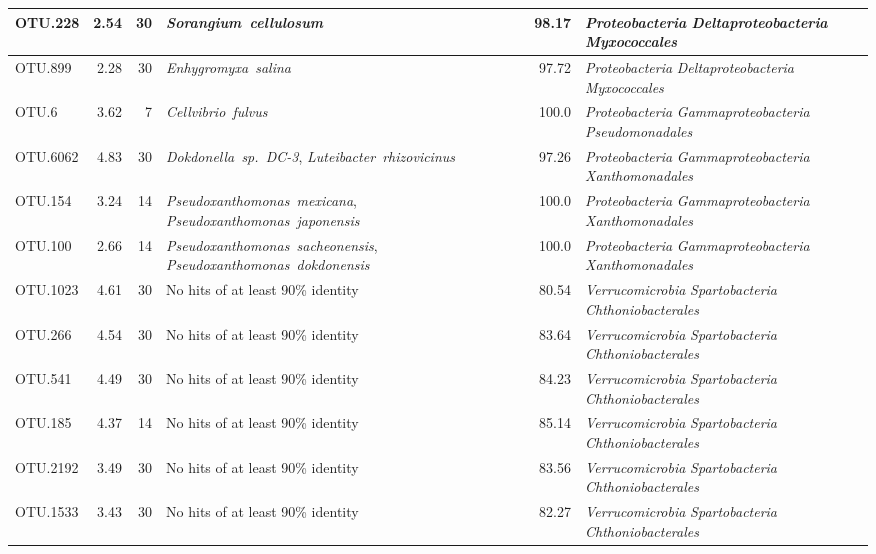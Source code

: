 \begin{ThreePartTable}
\begin{longtable}{lrrP{5cm}rP{5cm}}
OTU.228 & 2.54 & 30 & \mbox{\textit{Sorangium cellulosum}} & 98.17 & \mbox{\textit{Proteobacteria}} \mbox{\textit{Deltaproteobacteria}} \mbox{\textit{Myxococcales}} \\ \midrule
OTU.899 & 2.28 & 30 & \mbox{\textit{Enhygromyxa salina}} & 97.72 & \mbox{\textit{Proteobacteria}} \mbox{\textit{Deltaproteobacteria}} \mbox{\textit{Myxococcales}} \\ \midrule
OTU.6 & 3.62 & 7 & \mbox{\textit{Cellvibrio fulvus}} & 100.0 & \mbox{\textit{Proteobacteria}} \mbox{\textit{Gammaproteobacteria}} \mbox{\textit{Pseudomonadales}} \\ \midrule
OTU.6062 & 4.83 & 30 & \mbox{\textit{Dokdonella sp. DC-3}}, \mbox{\textit{Luteibacter rhizovicinus}} & 97.26 & \mbox{\textit{Proteobacteria}} \mbox{\textit{Gammaproteobacteria}} \mbox{\textit{Xanthomonadales}} \\ \midrule
OTU.154 & 3.24 & 14 & \mbox{\textit{Pseudoxanthomonas mexicana}}, \mbox{\textit{Pseudoxanthomonas japonensis}} & 100.0 & \mbox{\textit{Proteobacteria}} \mbox{\textit{Gammaproteobacteria}} \mbox{\textit{Xanthomonadales}} \\ \midrule
OTU.100 & 2.66 & 14 & \mbox{\textit{Pseudoxanthomonas sacheonensis}}, \mbox{\textit{Pseudoxanthomonas dokdonensis}} & 100.0 & \mbox{\textit{Proteobacteria}} \mbox{\textit{Gammaproteobacteria}} \mbox{\textit{Xanthomonadales}} \\ \midrule
OTU.1023 & 4.61 & 30 & {No hits of at least 90\% identity} & 80.54 & \mbox{\textit{Verrucomicrobia}} \mbox{\textit{Spartobacteria}} \mbox{\textit{Chthoniobacterales}} \\ \midrule
OTU.266 & 4.54 & 30 & {No hits of at least 90\% identity} & 83.64 & \mbox{\textit{Verrucomicrobia}} \mbox{\textit{Spartobacteria}} \mbox{\textit{Chthoniobacterales}} \\ \midrule
OTU.541 & 4.49 & 30 & {No hits of at least 90\% identity} & 84.23 & \mbox{\textit{Verrucomicrobia}} \mbox{\textit{Spartobacteria}} \mbox{\textit{Chthoniobacterales}} \\ \midrule
OTU.185 & 4.37 & 14 & {No hits of at least 90\% identity} & 85.14 & \mbox{\textit{Verrucomicrobia}} \mbox{\textit{Spartobacteria}} \mbox{\textit{Chthoniobacterales}} \\ \midrule
OTU.2192 & 3.49 & 30 & {No hits of at least 90\% identity} & 83.56 & \mbox{\textit{Verrucomicrobia}} \mbox{\textit{Spartobacteria}} \mbox{\textit{Chthoniobacterales}} \\ \midrule
OTU.1533 & 3.43 & 30 & {No hits of at least 90\% identity} & 82.27 & \mbox{\textit{Verrucomicrobia}} \mbox{\textit{Spartobacteria}} \mbox{\textit{Chthoniobacterales}} \\ \midrule

\end{longtable}
\end{ThreePartTable}
